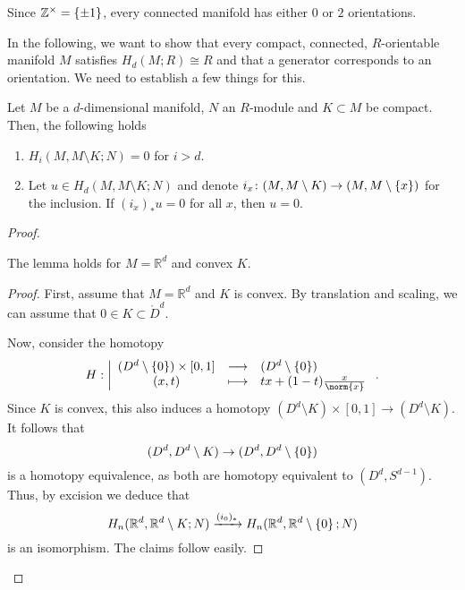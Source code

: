\begin{example}
  Since $\mathbb{Z}^{\times} = \left\{  \pm 1  \right\} $,
  every connected manifold has either $0$ or  $2$ orientations.
\end{example}

In the following,
we want to show that every compact, connected,
$R$-orientable manifold $M$ satisfies
$H_d(M;R) \cong R$ and that a generator corresponds
to an orientation.
We need to establish a few things for this.

\begin{lemma}
  \label{lm:top-homology-of-manifold-relative-to-cocompact-subset}
  Let $M$ be a $d$-dimensional manifold, $N$ an  $R$-module
  and  $K\subset M$ be compact.
  Then, the following holds
  \begin{enumerate}[h]
    \item $H_i(M, M\setminus K ; N) = 0$ for $i>d$.
    \item Let $u\in H_d(M, M \setminus K;N)$ and denote
      $i_x\colon (M, M \setminus K) \to  (M, M \setminus \left\{  x  \right\} )$
      for the inclusion.
      If $(i_x)_* u = 0$ for all  $x$, then $u=0$.
  \end{enumerate}
\end{lemma}

\begin{proof}
  \begin{claim}
    The lemma holds for $M = \mathbb{R}^d$ and convex $K$.
  \end{claim}
  \begin{proof}
    First, assume that $M = \mathbb{R}^d$ and $K$ is convex.
    By translation and scaling, we can assume that
    $0\in K\subset \mathring{D}^d$.

    Now, consider the homotopy
      \begin{equation*}
      H: \left| \begin{array}{c c l} 
        (D^d \setminus \set{ 0 } ) \times [0,1]
        & \longrightarrow &
        (D^d \setminus \set{ 0 } ) \\
        (x,t) & \longmapsto &  tx + (1-t) \frac{x}{\norm{x}}
      \end{array} \right.
      .
    \end{equation*}
    Since $K$ is convex, this also induces a homotopy
    $(D^d \setminus K) \times [0,1] \to  (D^d \setminus K)$.
    It follows that
    \[
      (D^d, D^d \setminus K) \to (D^d, D^d \setminus \left\{  0  \right\} )
    \]
    is a homotopy equivalence,
    as both are homotopy equivalent to $(D^d, S^{d-1})$.
    Thus, by excision we deduce that
    \[
      H_n(\mathbb{R}^d, \mathbb{R}^d \setminus K;N)
      \xrightarrow{(i_0)_*} 
      H_n(\mathbb{R}^d, \mathbb{R}^d \setminus \left\{  0  \right\} ;N)
    \]
    is an isomorphism.
    The claims follow easily.
  \end{proof}
\end{proof}
